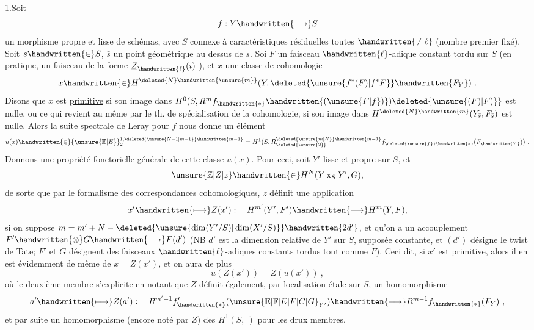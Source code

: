 
1.\quad Soit
\[
f:Y\handwritten{\longrightarrow}S
\]
un morphisme propre et lisse de schémas, avec $S$  connexe à caractéristiques résiduelles toutes $\handwritten{\ne\ell}$ (nombre premier fixé). Soit $s\handwritten{\in}S$, $\bar s$ un point géométrique au dessus de $s$. Soi $F$ un faisceau $\handwritten{\ell}$-adique constant tordu sur $S$ (en pratique, un faisceau de la forme $\underline{Z}_{\handwritten{\ell}}(i)$ ), et $x$ une classe de cohomologie
\[
x\handwritten{\in}H^{\deleted{N}\handwritten{\unsure{m}}}(Y,\deleted{\unsure{f^*(F)|f^*F}}\handwritten{F_Y})\ .
\]
Disons que $x$ est \uline{primitive} si son image dans $H^0(S,R^m f_{\handwritten{*}}\handwritten{(\unsure{F|f})})\deleted{\unsure{(F)|F)}}$ est nulle, ou ce qui revient au même par le th. de spécialisation de la cohomologie, si son image dans $H^{\deleted{N}\handwritten{m}}(Y_{\bar s},F_{\bar s})$ est nulle. Alors la suite spectrale de Leray pour $f$ nous donne un élément
\[
u(x)\handwritten{\in}{\unsure{\mathbb{E}|E}}_2^{1,\deleted{\unsure{N-1|m-1}}\handwritten{m-1}}=H^1(S,R^{\deleted{\unsure{m|N}}\handwritten{m-1}}_{\deleted{\unsure{2}}}f_{\deleted{\unsure{f}}\handwritten{*}}(F_{\handwritten{Y}}))\ .
\]
Donnons une propriété fonctorielle générale de cette classe $u(x)$. Pour ceci, soit $Y'$ lisse et propre sur $S$, et
\[
\unsure{\mathbb{Z}|Z|z}\handwritten{\in}H^N(Y\mathbin{\mathrm{x}}_S Y',G),
\]
de sorte que par le formalisme des correspondances cohomologiques, $z$ définit une application
\[
x'\handwritten{\longmapsto}Z(x'): \quad H^{m'}(Y',F')\handwritten{\longrightarrow}H^m(Y,F),
\]
si on suppose $m=m'+N-\deleted{\unsure{\dim(Y'/S)|\dim(X'/S)}}\handwritten{2d'}$, et qu'on a un accouplement $F'\handwritten{\otimes}G\handwritten{\longrightarrow}F(d')$ (NB $d'$ est la dimension relative de $Y'$ sur $S$, supposée constante, et $(d')$ désigne le twist de Tate; $F'$ et $G$ désignent des faisceaux $\handwritten{\ell}$-adiques constants tordus  tout comme $F$). Ceci dit, si $x'$ est primitive, alors il en est évidemment de même de $x=Z(x')$, et on aura de plus
\[
u(Z(x'))=Z(u(x'))\ ,
\]
où le deuxième membre s'explicite en notant que $Z$ définit également, par
localisation étale sur $S$, un homomorphisme
\[
a'\handwritten{\longmapsto}Z(a'):\quad R^{m'-1}f'_{\handwritten{*}}({\unsure{\mathbb{E}|\mathbb{F}|E|F|C|G}}_{Y'})\handwritten{\longrightarrow}R^{m-1}f_{\handwritten{*}}(F_Y)\ ,
\]
et par suite un homomorphisme (encore noté par $Z$) des $H^1(S,\ )$ pour les drux membres.

